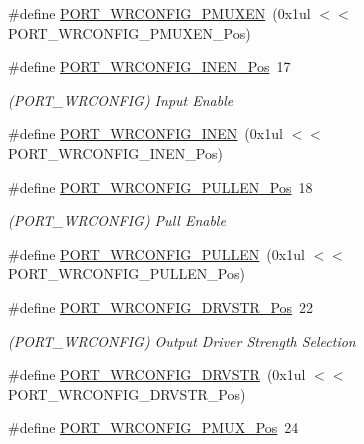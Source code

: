 \begin{DoxyCompactItemize}
\#define \mbox{\hyperlink{group___s_a_m_d21___p_o_r_t_ga6ab07d485a3b9379cf529664d618e768}{P\+O\+R\+T\+\_\+\+W\+R\+C\+O\+N\+F\+I\+G\+\_\+\+P\+M\+U\+X\+EN}}~(0x1ul $<$$<$ P\+O\+R\+T\+\_\+\+W\+R\+C\+O\+N\+F\+I\+G\+\_\+\+P\+M\+U\+X\+E\+N\+\_\+\+Pos)
\item 
\#define \mbox{\hyperlink{group___s_a_m_d21___p_o_r_t_ga54ebbb830cf16e6a9fc18bbc5879684a}{P\+O\+R\+T\+\_\+\+W\+R\+C\+O\+N\+F\+I\+G\+\_\+\+I\+N\+E\+N\+\_\+\+Pos}}~17
\begin{DoxyCompactList}\small\item\em (P\+O\+R\+T\+\_\+\+W\+R\+C\+O\+N\+F\+IG) Input Enable \end{DoxyCompactList}\item 
\#define \mbox{\hyperlink{group___s_a_m_d21___p_o_r_t_gadd5762cfb19c27a0831497111b8bf99f}{P\+O\+R\+T\+\_\+\+W\+R\+C\+O\+N\+F\+I\+G\+\_\+\+I\+N\+EN}}~(0x1ul $<$$<$ P\+O\+R\+T\+\_\+\+W\+R\+C\+O\+N\+F\+I\+G\+\_\+\+I\+N\+E\+N\+\_\+\+Pos)
\item 
\#define \mbox{\hyperlink{group___s_a_m_d21___p_o_r_t_ga69f7af299459c5a15bccf50da8b5240d}{P\+O\+R\+T\+\_\+\+W\+R\+C\+O\+N\+F\+I\+G\+\_\+\+P\+U\+L\+L\+E\+N\+\_\+\+Pos}}~18
\begin{DoxyCompactList}\small\item\em (P\+O\+R\+T\+\_\+\+W\+R\+C\+O\+N\+F\+IG) Pull Enable \end{DoxyCompactList}\item 
\#define \mbox{\hyperlink{group___s_a_m_d21___p_o_r_t_ga1b7efe7fb02e3da8402e319f0bd4314a}{P\+O\+R\+T\+\_\+\+W\+R\+C\+O\+N\+F\+I\+G\+\_\+\+P\+U\+L\+L\+EN}}~(0x1ul $<$$<$ P\+O\+R\+T\+\_\+\+W\+R\+C\+O\+N\+F\+I\+G\+\_\+\+P\+U\+L\+L\+E\+N\+\_\+\+Pos)
\item 
\#define \mbox{\hyperlink{group___s_a_m_d21___p_o_r_t_gae2dd656b888ede1553412037840d6ac4}{P\+O\+R\+T\+\_\+\+W\+R\+C\+O\+N\+F\+I\+G\+\_\+\+D\+R\+V\+S\+T\+R\+\_\+\+Pos}}~22
\begin{DoxyCompactList}\small\item\em (P\+O\+R\+T\+\_\+\+W\+R\+C\+O\+N\+F\+IG) Output Driver Strength Selection \end{DoxyCompactList}\item 
\#define \mbox{\hyperlink{group___s_a_m_d21___p_o_r_t_gaaa9cec94d7f7ebc2df0d6ce88456c797}{P\+O\+R\+T\+\_\+\+W\+R\+C\+O\+N\+F\+I\+G\+\_\+\+D\+R\+V\+S\+TR}}~(0x1ul $<$$<$ P\+O\+R\+T\+\_\+\+W\+R\+C\+O\+N\+F\+I\+G\+\_\+\+D\+R\+V\+S\+T\+R\+\_\+\+Pos)
\item 
\#define \mbox{\hyperlink{group___s_a_m_d21___p_o_r_t_gad821493573ea6954861bdb5007458439}{P\+O\+R\+T\+\_\+\+W\+R\+C\+O\+N\+F\+I\+G\+\_\+\+P\+M\+U\+X\+\_\+\+Pos}}~24

\end{DoxyCompactItemize}
